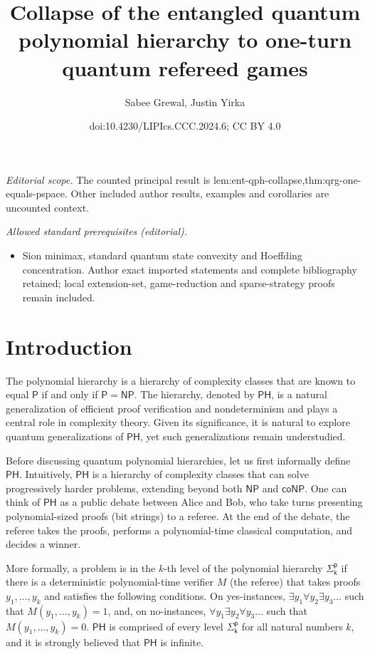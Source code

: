 \documentclass[10pt,a4paper]{article}
\title{Collapse of the entangled quantum polynomial hierarchy to one-turn quantum refereed games}
\author{Sabee Grewal, Justin Yirka}
\date{doi:10.4230/LIPIcs.CCC.2024.6; CC BY 4.0}
\theoremstyle{definition}
\newcommand{\class}[1]{\ensuremath{\mathsf{#1}}\xspace}
\newcommand{\PTIME}{\class{P}}
\newcommand{\NP}{\class{NP}}
\newcommand{\coNP}{\class{coNP}}
\newcommand{\PH}{\class{PH}}
\newcommand{\Sigmai}[1][i]{\class{\Sigma^{p}_{#1}}}
\begin{document}
\maketitle
\noindent\textit{Editorial scope.} The counted principal result is lem:ent-qph-collapse,thm:qrg-one-equals-pspace. Other included author results, examples and corollaries are uncounted context.\par\medskip
\noindent\textit{Allowed standard prerequisites (editorial).}\begin{itemize}
\item Sion minimax, standard quantum state convexity and Hoeffding concentration. Author exact imported statements and complete bibliography retained; local extension-set, game-reduction and sparse-strategy proofs remain included.
\end{itemize}\medskip
\section{Introduction}\label{sec:intro}

The polynomial hierarchy \cite{meyer1972equivalence,stockmeyer1976polynomial} is a hierarchy of complexity classes that are known to equal $\PTIME$ if and only if $\PTIME = \NP$. 
The hierarchy, denoted by $\PH$, is a natural generalization of efficient proof verification and nondeterminism and plays a central role in complexity theory. 
Given its significance, it is natural to explore quantum generalizations of $\PH$, yet such generalizations remain understudied. 


Before discussing quantum polynomial hierarchies, let us first informally define $\PH$. 
Intuitively, $\PH$ is a hierarchy of complexity classes that can solve progressively harder problems, extending beyond both \NP and \coNP.
One can think of $\PH$ as a public debate between Alice and Bob, who take turns presenting polynomial-sized proofs (bit strings) to a referee. 
At the end of the debate, the referee takes the proofs, performs a polynomial-time classical computation, and decides a winner. 

More formally, a problem is in the $k$-th level of the polynomial hierarchy $\Sigmai[k]$ if there is a deterministic polynomial-time verifier $M$ (the referee) that takes proofs $y_1, \dots, y_k$ and satisfies the following conditions. On yes-instances, $\exists y_1 \forall y_2 \exists y_3 \ldots$ such that $M(y_1,\ldots,y_k)=1$, and, on no-instances, $\forall y_1 \exists y_2 \forall y_3 \ldots$ such that $M(y_1,\ldots,y_k)=0$. $\PH$ is comprised of every level $\Sigmai[k]$ for all natural numbers $k$, and it is strongly believed that $\PH$ is infinite.
\end{document}
